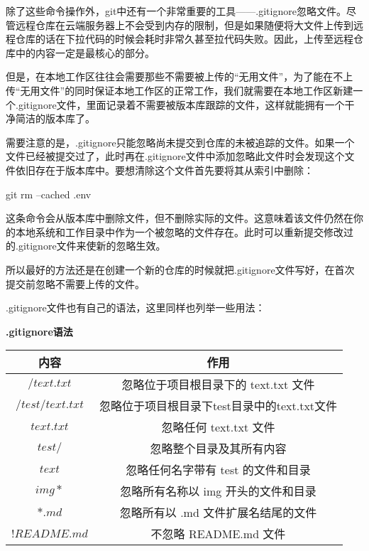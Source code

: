 除了这些命令操作外，git中还有一个非常重要的工具\enspace——\enspace .gitignore忽略文件。尽管远程仓库在云端服务器上不会受到内存的限制，但是如果随便将大文件上传到远程仓库的话在下拉代码的时候会耗时非常久甚至拉代码失败。因此，上传至远程仓库中的内容一定是最核心的部分。

但是，在本地工作区往往会需要那些不需要被上传的“无用文件”，为了能在不上传“无用文件”的同时保证本地工作区的正常工作，我们就需要在本地工作区新建一个.gitignore文件，里面记录着不需要被版本库跟踪的文件，这样就能拥有一个干净简洁的版本库了。

需要注意的是，.gitignore只能忽略尚未提交到仓库的未被追踪的文件。如果一个文件已经被提交过了，此时再在.gitignore文件中添加忽略此文件时会发现这个文件依旧存在于版本库中。要想清除这个文件首先要将其从索引中删除：

\begin{tcode}
	git rm --cached .env
\end{tcode}

这条命令会从版本库中删除文件，但不删除实际的文件。这意味着该文件仍然在你的本地系统和工作目录中作为一个被忽略的文件存在。此时可以重新提交修改过的.gitignore文件来使新的忽略生效。

所以最好的方法还是在创建一个新的仓库的时候就把.gitignore文件写好，在首次提交前忽略不需要上传的文件。

.gitignore文件也有自己的语法，这里同样也列举一些用法：

\begin{center}
\textbf{.gitignore语法}

	\begin{tabular}{cc}
		\toprule[1.5pt]
		内容 & 作用\\
		\midrule[1pt]
		$  /text.txt    $		&忽略位于项目根目录下的 text.txt 文件\\
		$  /test/text.txt    $		&忽略位于项目根目录下test目录中的text.txt文件\\
		$  text.txt   $		&忽略任何 text.txt 文件\\
		$  test/   $		&忽略整个目录及其所有内容\\
		$  text   $		&忽略任何名字带有 test 的文件和目录\\
		$  img*   $		&忽略所有名称以 img 开头的文件和目录\\
		$  *.md   $		&忽略所有以 .md 文件扩展名结尾的文件\\
		$  !README.md   $		&不忽略 README.md 文件\\
		\bottomrule[1.5pt]
	\end{tabular}
\end{center}

